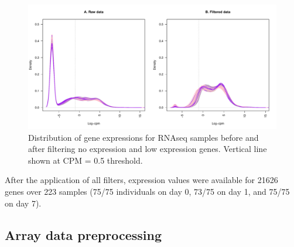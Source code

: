 \begin{figure}
    \includegraphics[width=1.0\textwidth]{mainmatter/figures/chapter_02/rnaseq_data_setup.sample_cpm_density_filtered.pdf}
    \caption{Distribution of gene expressions for \gls{RNAseq} samples before and after filtering no expression and low expression genes. Vertical line shown at \gls{CPM} = 0.5 threshold.}
    \label{fig:hird_rnaseq_cpm_filtering}
\end{figure}

After the application of all filters, expression values were available for 21626 genes over 223 samples (75/75 individuals on day 0, 73/75 on day 1, and 75/75 on day 7).

\subsection{Array data preprocessing}
\label{subsec:hird_dge_array_preproc}

